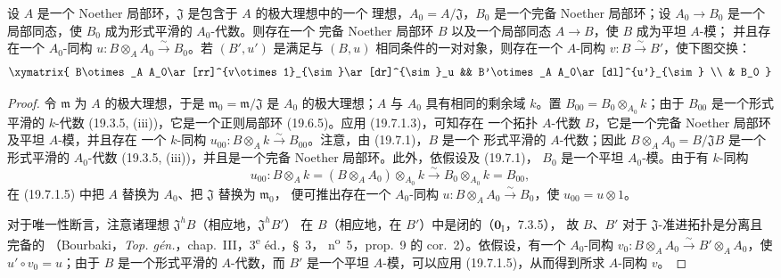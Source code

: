 \begin{theorem}[19.7.2]
\label{0.19.7.2-fr}
设 $A$ 是一个 Noether 局部环，$\mathfrak J$ 是包含于 $A$ 的极大理想中的一个
理想，$A_0=A/\mathfrak J$，$B_0$ 是一个完备 Noether 局部环；设
$A_0\to B_0$ 是一个局部同态，使 $B_0$ 成为形式平滑的 $A_0$-代数。则存在一个
完备 Noether 局部环 $B$ 以及一个局部同态 $A\to B$，使 $B$ 成为平坦 $A$-模；
并且存在一个 $A_0$-同构
$u:B\otimes_A A_0\xrightarrow{\sim}B_0$。若 $(B',u')$ 是满足与 $(B,u)$
相同条件的一对对象，则存在一个 $A$-同构
$v:B\xrightarrow{\sim}B'$，使下图交换：
\[
\xymatrix{
  B\otimes_A A_0\ar[rr]^{v\otimes1}_{\sim}\ar[dr]^{\sim}_u &&
  B'\otimes_A A_0\ar[dl]^{u'}_{\sim} \\
  & B_0
}
\]
\end{theorem}


\begin{proof}
令 $\mathfrak m$ 为 $A$ 的极大理想，于是
$\mathfrak m_0=\mathfrak m/\mathfrak J$ 是 $A_0$ 的极大理想；$A$ 与 $A_0$
具有相同的剩余域 $k$。置
$B_{00}=B_0\otimes_{A_0}k$；由于 $B_{00}$ 是一个形式平滑的 $k$-代数
(19.3.5, (iii))，它是一个正则局部环 (19.6.5)。应用 (19.7.1.3)，可知存在
一个拓扑 $A$-代数 $B$，它是一个完备 Noether 局部环及平坦 $A$-模，并且存在
一个 $k$-同构
$u_{00}:B\otimes_A k\xrightarrow{\sim}B_{00}$。注意，由 (19.7.1)，$B$ 是一个
形式平滑的 $A$-代数；因此
$B\otimes_A A_0=B/\mathfrak JB$ 是一个形式平滑的 $A_0$-代数
(19.3.5, (iii))，并且是一个完备 Noether 局部环。此外，依假设及 (19.7.1)，
$B_0$ 是一个平坦 $A_0$-模。由于有 $k$-同构
\[
  u_{00}:B\otimes_A k=(B\otimes_A A_0)\otimes_{A_0}k
  \xrightarrow{\sim}B_0\otimes_{A_0}k=B_{00},
\]
在 (19.7.1.5) 中把 $A$ 替换为 $A_0$、把 $\mathfrak J$ 替换为 $\mathfrak m_0$，
便可推出存在一个 $A_0$-同构
$u:B\otimes_A A_0\xrightarrow{\sim}B_0$，使 $u_{00}=u\otimes1$。

对于唯一性断言，注意诸理想 $\mathfrak J^hB$（相应地，$\mathfrak J^hB'$）
在 $B$（相应地，在 $B'$）中是闭的（$\mathbf 0_{\mathrm I}$，7.3.5），
故 $B$、$B'$ 对于 $\mathfrak J$-准进拓扑是分离且完备的
（Bourbaki，\emph{Top. gén.}，chap.~III，3\textsuperscript{e} éd.，§~3，
n\textsuperscript{o}~5，prop.~9 的 cor.~2）。依假设，有一个 $A_0$-同构
$v_0:B\otimes_A A_0\xrightarrow{\sim}B'\otimes_A A_0$，使
$u'\circ v_0=u$；由于 $B$ 是一个形式平滑的 $A$-代数，而 $B'$ 是一个平坦
$A$-模，可以应用 (19.7.1.5)，从而得到所求 $A$-同构 $v$。
\end{proof}

